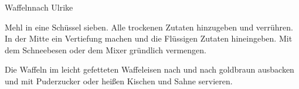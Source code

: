 \begin{recipe}{Waffeln}{nach Ulrike}
  \label{Waffeln}
  \inglist

  \steps
  Mehl in eine Schüssel sieben. Alle trockenen Zutaten hinzugeben und
  verrühren. In der Mitte ein Vertiefung machen und die Flüssigen Zutaten
  hineingeben. Mit dem Schneebesen oder dem Mixer gründlich vermengen.

  Die Waffeln im leicht gefetteten Waffeleisen nach und nach goldbraun
  ausbacken und mit Puderzucker oder heißen Kischen und Sahne servieren.
\end{recipe}
